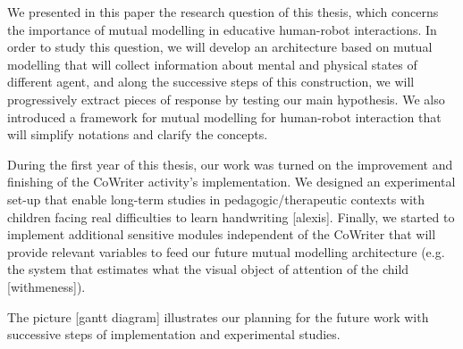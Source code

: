 \documentclass[10pt,a4paper,twocolumn]{article}
\begin{document}
We presented in this paper the research question of this thesis, which concerns the importance of mutual modelling in educative human-robot interactions. In order to study this question, we will develop an architecture based on mutual modelling that will collect information about mental and physical states of different agent, and along the successive steps of this construction, we will progressively extract pieces of response by testing our main hypothesis. We also introduced a framework for mutual modelling for human-robot interaction that will simplify notations and clarify the concepts. 

During the first year of this thesis, our work was turned on the improvement and finishing of the CoWriter activity's implementation. We designed an experimental set-up that enable long-term studies in pedagogic/therapeutic contexts with children facing real difficulties to learn handwriting [alexis]. Finally, we started to implement additional sensitive modules independent of the CoWriter that will provide relevant variables to feed our future mutual modelling architecture (e.g. the system that estimates what the visual object of attention of the child [withmeness]).

The picture [gantt diagram] illustrates our planning for the future work with successive steps of implementation and experimental studies.






 
\end{document}
